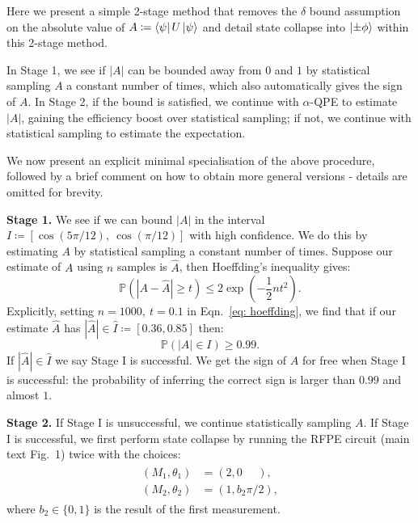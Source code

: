\documentclass[twocolumn,
 reprint,
 amsmath,amssymb,
 aps,
 floatfix,
superscriptaddress
]{revtex4-1}
\begin{document}
Here we present a simple 2-stage method that removes the $\delta$ bound assumption on the absolute value of $A\coloneqq \Bra{\psi}U\Ket{\psi}$ and detail state collapse into $\Ket{\pm \phi}$ within this 2-stage method.

In Stage 1, we see if $|A|$ can be bounded away from $0$ and $1$ by statistical sampling $A$ a constant number of times, which also automatically gives the sign of $A$. In Stage 2, if the bound is satisfied, we continue with $\alpha$-QPE to estimate $|A|$, gaining the efficiency boost over statistical sampling; if not, we continue with statistical sampling to estimate the expectation. 

We now present an explicit minimal specialisation of the above procedure, followed by a brief comment on how to obtain more general versions - details are omitted for brevity. 

\textbf{Stage 1.} We see if we can bound $|A|$ in the interval $I \coloneqq [\cos(5\pi/12), \ \cos(\pi/12)]$ with high confidence. We do this by estimating $A$ by statistical sampling a constant number of times. Suppose our estimate of $A$ using $n$ samples is $\hat{A}$, then Hoeffding's inequality gives:
\begin{equation}
\mathbb{P}(|A-\hat{A}| \geq t) \leq 2 \exp(-\frac{1}{2}nt^2).
\label{eq: hoeffding}
\end{equation}
Explicitly, setting $n=1000, \  t=0.1$ in Eqn.~\ref{eq: hoeffding}, we find that if our estimate $\hat{A}$ has $|\hat{A}|\in \hat{I}\coloneqq[0.36,0.85]$ then:
\begin{equation}\label{eq: exp_bound}
    \mathbb{P}(|A|\in I) \geq 0.99. 
\end{equation}
If $|\hat{A}| \in \hat{I}$ we say Stage I is successful. We get the sign of $A$ for free when Stage I is successful: the probability of inferring the correct sign is larger than $0.99$ and almost $1$.

\textbf{Stage 2.} If Stage I is unsuccessful, we continue statistically sampling $A$. If Stage I is successful, we first perform state collapse by running the RFPE circuit (main text Fig.~1) twice with the choices:
\begin{align}
\begin{split}
(M_1, \theta_1) &= (2, 0 \ \ \ \ \ \ ), \\
(M_2, \theta_2) &= (1,   b_2 \pi/2),
\end{split}
\end{align}
where $b_2\in \{0,1\}$ is the result of the first measurement.
\end{document}
